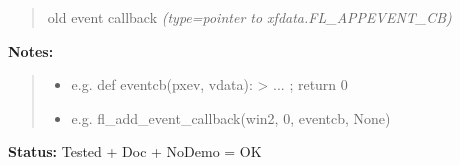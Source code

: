 \begin{boxedminipage}{\funcwidth}
\begin{quote}
old event callback
      {\it (type=pointer to xfdata.FL\_APPEVENT\_CB)}

      \end{quote}

\textbf{Notes:}
\begin{quote}
  \begin{itemize}

  \item
    \setlength{\parskip}{0.6ex}

e.g. def eventcb(pxev, vdata): > ... ; return 0


  \item 
e.g. fl\_add\_event\_callback(win2, 0, eventcb, None)


\end{itemize}

\end{quote}

\textbf{Status:} 
Tested + Doc + NoDemo = OK


    \end{boxedminipage}

    \label{xformslib:flxbasic:fl_remove_event_callback}

    \vspace{0.5ex}

